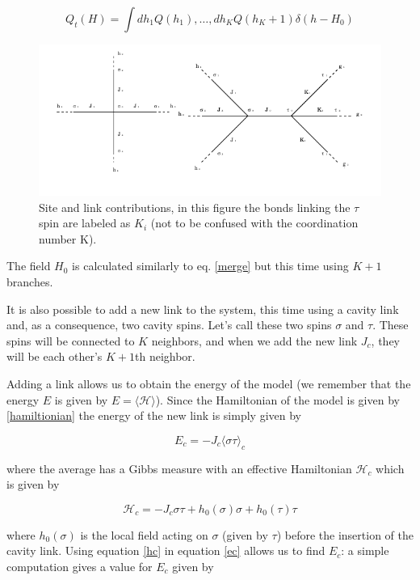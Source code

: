 \begin{equation}
Q_t(H) = \int dh_1Q(h_1),\ldots,dh_KQ(h_K+1) \delta(h-H_0)
\label{true}
\end{equation}

\begin{figure}[h]
\centering
\includegraphics[scale =0.8]{img/sitebond.png}
\caption{Site and link contributions, in this figure the bonds linking the $\tau$ spin are labeled as $K_i$ (not to be confused with the coordination number K).}
\label{fig:sitebond}
\end{figure}

The field $H_0$ is calculated similarly to eq. \ref{merge} but this time using $K+1$ branches.

It is also possible to add a new link to the system, this time using a cavity link and, as a consequence, two cavity spins. Let's call these two spins $\sigma$ and $\tau$. These spins will be connected to $K$ neighbors, and when we add the new link $J_c$, they will be each other's $K+1$th neighbor.

Adding a link allows us to obtain the energy of the model (we remember that the energy $E$ is given by $E = \langle \mathcal{H} \rangle$). Since the Hamiltonian of the model is given by \ref{hamiltionian} the energy of the new link is simply given by

\begin{equation}
E_{c} = - J_c \langle \sigma \tau \rangle_c
\label{ec}
\end{equation}

where the average has a Gibbs measure with an effective Hamiltonian $\mathcal{H}_c$ which is given by

\begin{equation}
\mathcal{H}_c = - J_c \sigma \tau + h_0(\sigma)\sigma + h_0(\tau)\tau
\label{hc}
\end{equation}

where $h_0(\sigma)$ is the local field acting on $\sigma$ (given by $\tau$) before the insertion of the cavity link.
Using equation \ref{hc} in equation \ref{ec} allows us to find $E_c$: a simple computation gives a value for $E_c$ given by

